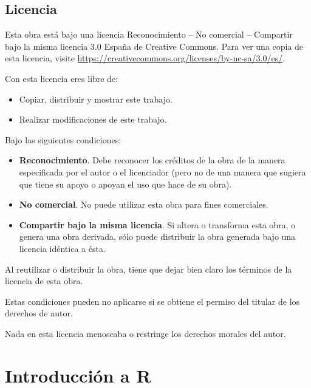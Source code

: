 \documentclass[
  a4paper,
]{scrreport}
\providecommand{\tightlist}{%
  \setlength{\itemsep}{0pt}\setlength{\parskip}{0pt}}\usepackage{longtable,booktabs,array}
\theoremstyle{definition}
\theoremstyle{remark}
\begin{document}
\hypertarget{licencia}{%
\section*{Licencia}\label{licencia}}


Esta obra está bajo una licencia Reconocimiento -- No comercial --
Compartir bajo la misma licencia 3.0 España de Creative Commons. Para
ver una copia de esta licencia, visite
\url{https://creativecommons.org/licenses/by-nc-sa/3.0/es/}.

Con esta licencia eres libre de:

\begin{itemize}
\tightlist
\item
  Copiar, distribuir y mostrar este trabajo.
\item
  Realizar modificaciones de este trabajo.
\end{itemize}

Bajo las siguientes condiciones:

\begin{itemize}
\item
  \textbf{Reconocimiento}. Debe reconocer los créditos de la obra de la
  manera especificada por el autor o el licenciador (pero no de una
  manera que sugiera que tiene su apoyo o apoyan el uso que hace de su
  obra).
\item
  \textbf{No comercial}. No puede utilizar esta obra para fines
  comerciales.
\item
  \textbf{Compartir bajo la misma licencia}. Si altera o transforma esta
  obra, o genera una obra derivada, sólo puede distribuir la obra
  generada bajo una licencia idéntica a ésta.
\end{itemize}

Al reutilizar o distribuir la obra, tiene que dejar bien claro los
términos de la licencia de esta obra.

Estas condiciones pueden no aplicarse si se obtiene el permiso del
titular de los derechos de autor.

Nada en esta licencia menoscaba o restringe los derechos morales del
autor.


\hypertarget{introducciuxf3n-a-r}{%
\chapter{Introducción a R}\label{introducciuxf3n-a-r}}
\end{document}
